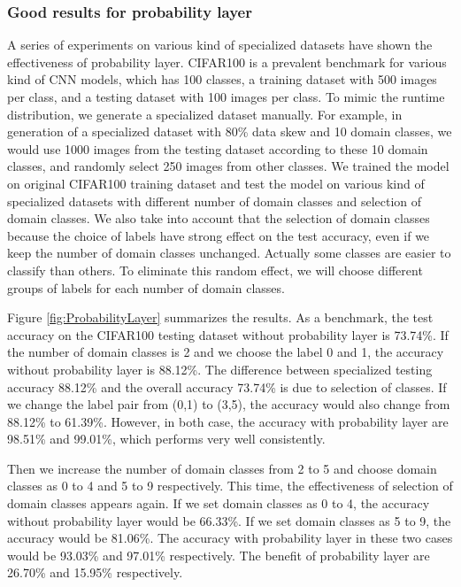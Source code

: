 \documentclass{article}
\begin{document}
\subsubsection{Good results for probability layer}
A series of experiments on various kind of specialized datasets have shown the effectiveness of probability layer. CIFAR100 is a prevalent benchmark for various kind of CNN models, which has 100 classes, a training dataset with 500 images per class, and a testing dataset with 100 images per class. To mimic the runtime distribution, we generate a specialized dataset manually. For example, in generation of a specialized dataset with 80\% data skew and 10 domain classes, we would use 1000 images from the testing dataset according to these 10 domain classes, and randomly select 250 images from other classes. We trained the model on original CIFAR100 training dataset and test the model on various kind of specialized datasets with different number of domain classes and selection of domain classes. We also take into account that the selection of domain classes because the choice of labels have strong effect on the test accuracy, even if we keep the number of domain classes unchanged. Actually some classes are easier to classify than others. To eliminate this random effect, we will choose different groups of labels for each number of domain classes.

Figure \ref{fig:ProbabilityLayer} summarizes the results. As a benchmark, the test accuracy on the CIFAR100 testing dataset without probability layer is 73.74\%. If the number of domain classes is 2 and we choose the label 0 and 1, the accuracy without probability layer is 88.12\%. The difference between specialized testing accuracy 88.12\% and the overall accuracy 73.74\% is due to selection of classes. If we change the label pair from (0,1) to (3,5), the accuracy would also change from 88.12\% to 61.39\%. However, in both case, the accuracy with probability layer are 98.51\% and 99.01\%, which performs very well consistently. 

Then we increase the number of domain classes from 2 to 5 and choose domain classes as 0 to 4 and 5 to 9 respectively. This time, the effectiveness of selection of domain classes appears again. If we set domain classes as 0 to 4, the accuracy without probability layer would be 66.33\%. If we set domain classes as 5 to 9, the accuracy would be 81.06\%. The accuracy with probability layer in these two cases would be 93.03\% and 97.01\% respectively. The benefit of probability layer are 26.70\% and 15.95\% respectively.
\end{document}
